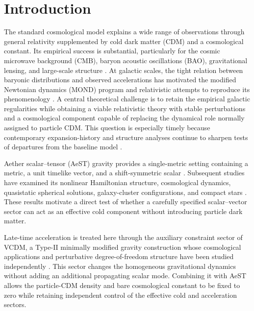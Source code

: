 \section{Introduction}\label{sec:intro}
The standard cosmological model explains a wide range of observations through general relativity supplemented by cold dark matter (CDM) and a cosmological constant. Its empirical success is substantial, particularly for the cosmic microwave background (CMB), baryon acoustic oscillations (BAO), gravitational lensing, and large-scale structure \cite{Planck2020VI,DESI2024VI,DESIDR2II2025,Madhavacheril2024,DESY3Cosmology2022}. At galactic scales, the tight relation between baryonic distributions and observed accelerations has motivated the modified Newtonian dynamics (MOND) program and relativistic attempts to reproduce its phenomenology \cite{Milgrom1983,Bekenstein2004,LelliMcGaughSchombert2016,McGaughLelliSchombert2016}. A central theoretical challenge is to retain the empirical galactic regularities while obtaining a viable relativistic theory with stable perturbations and a cosmological component capable of replacing the dynamical role normally assigned to particle CDM. This question is especially timely because contemporary expansion-history and structure analyses continue to sharpen tests of departures from the baseline model \cite{DiValentino2021,Schoneberg2022,PerivolaropoulosSkara2022,DES2024SN,EuclidWeakLensing2024}.

Aether scalar--tensor (AeST) gravity provides a single-metric setting containing a metric, a unit timelike vector, and a shift-symmetric scalar \cite{SkordisZlosnik2021,SkordisZlosnik2022}. Subsequent studies have examined its nonlinear Hamiltonian structure, cosmological dynamics, quasistatic spherical solutions, galaxy-cluster configurations, and compact stars \cite{BatakiSkordisZlosnik2024,RosaZlosnik2024,VerwayenSkordisBoehm2024,DurakovicSkordis2024,ReyesSakstein2024,ReyesSakstein2025}. These results motivate a direct test of whether a carefully specified scalar--vector sector can act as an effective cold component without introducing particle dark matter.

Late-time acceleration is treated here through the auxiliary constraint sector of VCDM, a Type-II minimally modified gravity construction whose cosmological applications and perturbative degree-of-freedom structure have been studied independently \cite{DeFeliceMukohyamaPookkillath2021,DeFeliceMaedaMukohyamaPookkillath2022,GanzMartensMukohyamaNamba2023,AkarsuEtAl2024VCDM,AkarsuEtAl2026VCDM}. This sector changes the homogeneous gravitational dynamics without adding an additional propagating scalar mode. Combining it with AeST allows the particle-CDM density and bare cosmological constant to be fixed to zero while retaining independent control of the effective cold and acceleration sectors.

